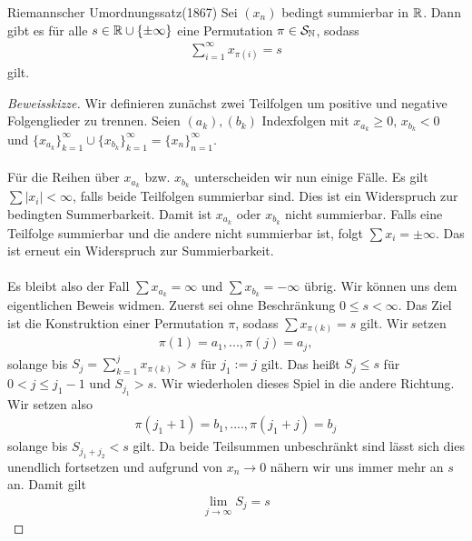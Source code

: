\begin{genericthm}{Riemannscher Umordnungssatz(1867)}\label{th:riemann_rearrangement_lemma}
	Sei $ (x_n) $ bedingt summierbar in $ \mathbb{R} $.
	Dann gibt es für alle $ s \in \mathbb{R} \cup \{ \pm \infty\} $ eine Permutation $ \pi \in \mathcal{S}_{\mathbb{N}} $, sodass
	\begin{align*}
	\sum \limits_{i=1}^\infty x_{\pi(i) } = s
	\end{align*}
	gilt. 
\end{genericthm}

\begin{proof}[Beweisskizze]
	Wir definieren zunächst zwei Teilfolgen um positive und negative Folgenglieder zu trennen. Seien $ (a_k) , (b_k)$ Indexfolgen mit $ x_{a_k} \geq 0  $, $ x_{b_k} < 0 $
	und $ \{x_{a_k}\}_{k=1}^\infty \cup \{x_{b_k}\}_{k=1}^\infty = \{ x_n\}_{n =1}^\infty $.\\
	\\
	Für die Reihen über $ x_{a_k} $ bzw. $ x_{b_k} $ unterscheiden wir nun einige Fälle.
	Es gilt $ \sum | x_i | < \infty $, falls beide Teilfolgen summierbar sind.
	Dies ist ein Widerspruch zur bedingten Summerbarkeit. Damit ist $ x_{a_k} $ oder $ x_{b_k} $ nicht summierbar.
	Falls eine Teilfolge summierbar und die andere nicht summierbar ist, folgt $ \sum x_i = \pm \infty $. Das ist erneut ein Widerspruch zur Summierbarkeit.\\
	\\
	Es bleibt also der Fall $ \sum x_{a_k} = \infty $ und $ \sum x_{b_k} = - \infty $ übrig. Wir können uns dem eigentlichen Beweis widmen.
	Zuerst sei ohne Beschränkung $0 \leq  s < \infty $. Das Ziel ist die Konstruktion einer Permutation $ \pi $, sodass $ \sum x_{\pi(k)} = s $ gilt.
	Wir setzen
	\begin{align*}
	\pi(1)= a_1,...,\pi(j)= a_j, 
	\end{align*}
	solange bis $ S_j = \sum_{k =1}^j x_{\pi(k)} > s $ für $ j_1 := j $ gilt.
	Das heißt $ S_j \leq s $ für $ 0 < j \leq j_1 - 1 $ und $ S_{j_1} > s $.
	Wir wiederholen dieses Spiel in die andere Richtung. Wir setzen also
	\begin{align*}
	\pi(j_1 + 1 ) = b_1,....,\pi(j_1+j) = b_j 
	\end{align*}
	solange bis $ S_{j_1 + j_2 } < s  $ gilt.
	Da beide Teilsummen unbeschränkt sind lässt sich dies unendlich fortsetzen und aufgrund von $ x_n \to 0  $ nähern wir uns immer mehr an $ s $ an.
	Damit gilt 
	\begin{align*}
	\lim \limits_{j \to \infty}
	S_j = s
	\end{align*}

\end{proof}
